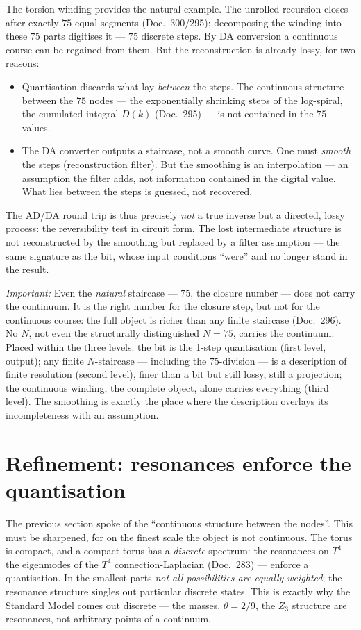 The torsion winding provides the natural example. The unrolled recursion closes
after exactly $75$ equal segments (Doc.~300/295); decomposing the winding into
these $75$ parts digitises it --- $75$ discrete steps. By DA conversion a
continuous course can be regained from them. But the reconstruction is already
lossy, for two reasons:
\begin{itemize}
  \item Quantisation discards what lay \emph{between} the steps. The continuous
    structure between the $75$ nodes --- the exponentially shrinking steps of the
    log-spiral, the cumulated integral $D(k)$ (Doc.~295) --- is not contained in
    the $75$ values.
  \item The DA converter outputs a staircase, not a smooth curve. One must
    \emph{smooth} the steps (reconstruction filter). But the smoothing is an
    interpolation --- an assumption the filter adds, not information contained in
    the digital value. What lies between the steps is guessed, not recovered.
\end{itemize}
The AD/DA round trip is thus precisely \emph{not} a true inverse but a directed,
lossy process: the reversibility test in circuit form. The lost intermediate
structure is not reconstructed by the smoothing but replaced by a filter
assumption --- the same signature as the bit, whose input conditions
\enquote{were} and no longer stand in the result.

\emph{Important:} Even the \emph{natural} staircase --- $75$, the closure number
--- does not carry the continuum. It is the right number for the closure step,
but not for the continuous course: the full object is richer than any finite
staircase (Doc.~296). No $N$, not even the structurally distinguished $N=75$,
carries the continuum. Placed within the three levels: the bit is the 1-step
quantisation (first level, output); any finite $N$-staircase --- including the
$75$-division --- is a description of finite resolution (second level), finer than
a bit but still lossy, still a projection; the continuous winding, the complete
object, alone carries everything (third level). The smoothing is exactly the
place where the description overlays its incompleteness with an assumption.

\section{Refinement: resonances enforce the quantisation}

The previous section spoke of the \enquote{continuous structure between the
nodes}. This must be sharpened, for on the finest scale the object is not
continuous. The torus is compact, and a compact torus has a \emph{discrete}
spectrum: the resonances on $T^4$ --- the eigenmodes of the $T^4$
connection-Laplacian (Doc.~283) --- enforce a quantisation. In the smallest parts
\emph{not all possibilities are equally weighted}; the resonance structure
singles out particular discrete states. This is exactly why the Standard Model
comes out discrete --- the masses, $\theta=2/9$, the $Z_3$ structure are
resonances, not arbitrary points of a continuum.

